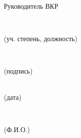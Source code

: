 \documentclass[14pt]{extarticle}
\begin{document}
\vspace{3em}
\noindent Руководитель ВКР\\
\noindent
\makebox[0.0cm][l]{\underline{\hspace{\linewidth}}}%
\parbox[t]{5.4cm}{ \\[-0.2em]%
{\centering\footnotesize (уч. степень, должность)\par}}%
\parbox[t]{4.0cm}{\, \\[-0.2em]%
{\centering\footnotesize (подпись)\par}}%
\parbox[t]{2.5cm}{ {\, \\[-0.2em] \footnotesize (дата)\par}}%
\parbox[t]{4.5cm}{{\centering%
}\\[-0.2em]{\centering\footnotesize (Ф.И.О.)\par}}%

\restoregeometry

\clearpage
\initpagenumbering
\setcounter{page}{4} %
\end{document}
